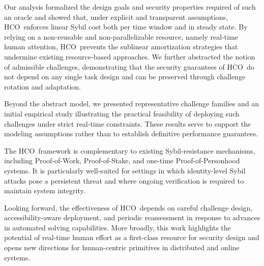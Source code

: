 \documentclass[11pt]{article}
\newcommand{\HCO}{HCO\xspace}
\begin{document}
Our analysis formalized the design goals and security properties required of such an oracle and showed that, under explicit and transparent assumptions, \HCO\ enforces linear Sybil cost both per time window and in steady state. By relying on a non-reusable and non-parallelizable resource,
namely real-time human attention, \HCO\ prevents the sublinear amortization strategies
 that undermine existing resource-based approaches. We further abstracted the notion of admissible challenges, demonstrating that the security guarantees of \HCO\ do not depend on any single task design and can be preserved through challenge rotation and adaptation.

Beyond the abstract model, we presented representative challenge families and an initial empirical study illustrating the practical feasibility of deploying such challenges under strict real-time constraints. These results serve to support the modeling assumptions rather than to establish definitive performance guarantees.

The \HCO\ framework is complementary to existing Sybil-resistance mechanisms, including Proof-of-Work, Proof-of-Stake, and one-time Proof-of-Personhood systems. It is particularly well-suited for settings in which identity-level Sybil attacks pose a persistent threat and where ongoing verification is required to maintain system integrity.

Looking forward, the effectiveness of \HCO\ depends on careful challenge design, accessibility-aware deployment, and periodic reassessment in response to advances in automated solving capabilities. More broadly, this work highlights the potential of real-time human effort as a first-class resource for security design and opens new directions for human-centric primitives in distributed and online systems.

	
	
	
	
\end{document}
